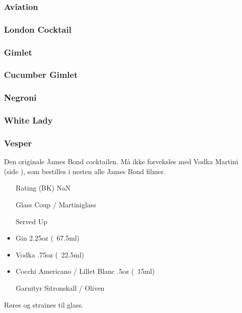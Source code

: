 \subsubsection{Aviation}

\subsubsection{London Cocktail}

\subsubsection{Gimlet}

\subsubsection{Cucumber Gimlet}

\subsubsection{Negroni}

\subsubsection{White Lady}

\subsubsection{Vesper}
\label{drink:vesper}
Den originale James Bond cocktailen. Må ikke forveksles med Vodka Martini (side \pageref{drink:v_martini}), som bestilles i nesten alle James Bond filmer.
\begin{itemize}
    \item[Rating (BK)] NaN
    \item[Glass] Coup / Martiniglass
    \item[Served] Up
    \item Gin 2.25oz (~67.5ml)
    \item Vodka .75oz (~22.5ml)
    \item Cocchi Americano / Lillet Blanc .5oz (~15ml)
    \item[Garnityr] Sitronskall / Oliven
\end{itemize}
Røres og straines til glass.
